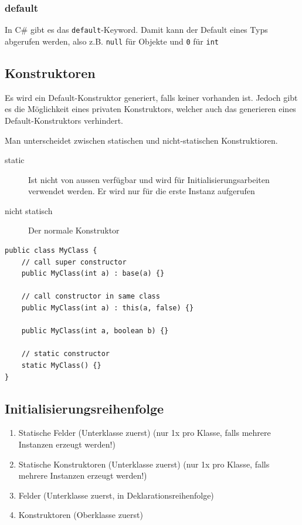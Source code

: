 \documentclass[
a4paper,
oneside,
10pt,
fleqn,
headsepline,
toc=listofnumbered, 
bibliography=totocnumbered]{scrartcl}
\begin{document}
\subsubsection{default}
In C\# gibt es das \lstinline|default|-Keyword. Damit kann der Default eines Typs abgerufen werden, also z.B. \lstinline|null| für Objekte und \lstinline|0| für \lstinline|int|

\subsection{Konstruktoren}

Es wird ein Default-Konstruktor generiert, falls keiner vorhanden ist. Jedoch gibt es die Möglichkeit eines privaten Konstruktors, welcher auch das generieren eines Default-Konstruktors verhindert.

Man unterscheidet zwischen statischen und nicht-statischen Konstruktioren.
\begin{description}
	\item[static] Ist nicht von aussen verfügbar und wird für Initialisierungsarbeiten verwendet werden. Er wird nur für die erste Instanz aufgerufen
	\item[nicht statisch] Der normale Konstruktor
\end{description}

\begin{lstlisting}
public class MyClass {
	// call super constructor
	public MyClass(int a) : base(a) {}

	// call constructor in same class
	public MyClass(int a) : this(a, false) {}
	
	public MyClass(int a, boolean b) {}
	
	// static constructor
	static MyClass() {}
}
\end{lstlisting}

\subsection{Initialisierungsreihenfolge}
\begin{enumerate}
	\item Statische Felder (Unterklasse zuerst) (nur 1x pro Klasse, falls mehrere Instanzen erzeugt werden!)
	\item Statische Konstruktoren (Unterklasse zuerst) (nur 1x pro Klasse, falls mehrere Instanzen erzeugt werden!)
	\item Felder (Unterklasse zuerst, in Deklarationsreihenfolge)
	\item Konstruktoren (Oberklasse zuerst)
\end{enumerate}
\end{document}
